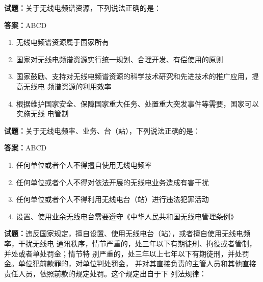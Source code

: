 \documentclass{ctexbook}
\begin{document}
\vspace{1em}

\textbf{试题：}关于无线电频谱资源，下列说法正确的是： 

\textbf{答案：}ABCD 

\begin{enumerate}[leftmargin=3em]
  \item 无线电频谱资源属于国家所有 

  \item 国家对无线电频谱资源实行统一规划、合理开发、有偿使用的原则 

  \item 国家鼓励、支持对无线电频谱资源的科学技术研究和先进技术的推广应用，提高无线电
频谱资源的利用效率 

  \item 根据维护国家安全、保障国家重大任务、处置重大突发事件等需要，国家可以实施无线
电管制 

\end{enumerate}





\vspace{1em}

\textbf{试题：}关于无线电频率、业务、台（站），下列说法正确的是： 

\textbf{答案：}ABCD 

\begin{enumerate}[leftmargin=3em]
  \item 任何单位或者个人不得擅自使用无线电频率 

  \item 任何单位或者个人不得对依法开展的无线电业务造成有害干扰 

  \item 任何单位或者个人不得利用无线电台（站）进行违法犯罪活动 

  \item 设置、使用业余无线电台需要遵守《中华人民共和国无线电管理条例》 

\end{enumerate}





\vspace{1em}

\textbf{试题：}违反国家规定，擅自设置、使用无线电台（站），或者擅自使用无线电频率，干扰无线电
通讯秩序，情节严重的，处三年以下有期徒刑、拘役或者管制，并处或者单处罚金；情节特
别严重的，处三年以上七年以下有期徒刑，并处罚金。单位犯前款罪的，对单位判处罚金，
并对其直接负责的主管人员和其他直接责任人员，依照前款的规定处罚。这个规定出自于下
列法规律： 
\end{document}
